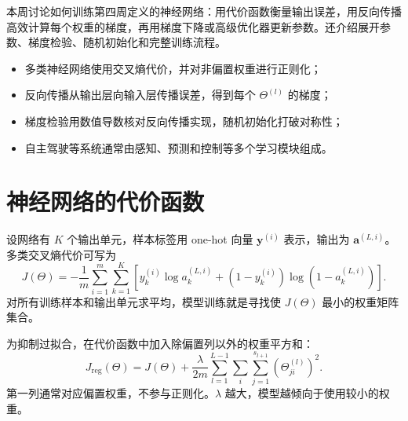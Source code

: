 


\begin{summarybox}
本周讨论如何训练第四周定义的神经网络：用代价函数衡量输出误差，用反向传播高效计算每个权重的梯度，再用梯度下降或高级优化器更新参数。还介绍展开参数、梯度检验、随机初始化和完整训练流程。
\begin{itemize}[leftmargin=2em,itemsep=2pt,topsep=4pt]
  \item 多类神经网络使用交叉熵代价，并对非偏置权重进行正则化；
  \item 反向传播从输出层向输入层传播误差，得到每个 $\Theta^{(l)}$ 的梯度；
  \item 梯度检验用数值导数核对反向传播实现，随机初始化打破对称性；
  \item 自主驾驶等系统通常由感知、预测和控制等多个学习模块组成。
\end{itemize}
\end{summarybox}

\section{神经网络的代价函数}
\begin{definitionbox}[多类分类代价]
设网络有 $K$ 个输出单元，样本标签用 one-hot 向量 $\mathbf y^{(i)}$ 表示，输出为 $\mathbf a^{(L,i)}$。多类交叉熵代价可写为
\[
J(\Theta)=-\frac1m\sum_{i=1}^{m}\sum_{k=1}^{K}
\left[y_k^{(i)}\log a_k^{(L,i)}+(1-y_k^{(i)})\log(1-a_k^{(L,i)})\right].
\]
对所有训练样本和输出单元求平均，模型训练就是寻找使 $J(\Theta)$ 最小的权重矩阵集合。
\end{definitionbox}
\begin{keybox}[正则化神经网络]
为抑制过拟合，在代价函数中加入除偏置列以外的权重平方和：
\[
J_{\mathrm{reg}}(\Theta)=J(\Theta)+\frac{\lambda}{2m}
\sum_{l=1}^{L-1}\sum_{i}\sum_{j=1}^{s_{l+1}}\left(\Theta_{ji}^{(l)}\right)^2.
\]
第一列通常对应偏置权重，不参与正则化。$\lambda$ 越大，模型越倾向于使用较小的权重。
\end{keybox}

